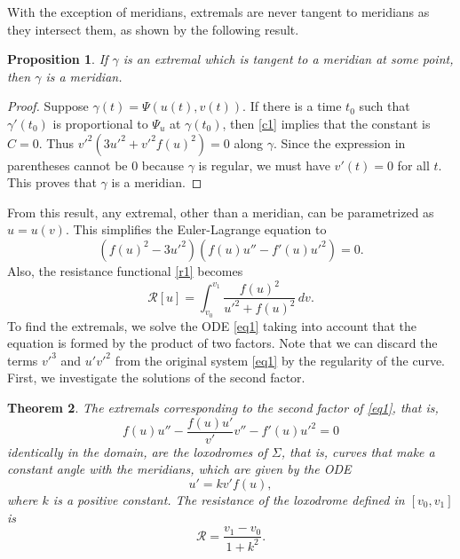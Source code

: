 \documentclass[a4paper,12pt]{amsart}
\newtheorem{theorem}{Theorem}[section]
\newtheorem{proposition}[theorem]{Proposition}
\theoremstyle{definition}
\def\R{\mathcal{ R}}
\begin{document}
With the exception of meridians, extremals are never tangent to meridians as they intersect them, as shown by the following result. 

\begin{proposition} If $\gamma$ is an extremal which is tangent to a meridian at some point, then $\gamma$ is a meridian.
\end{proposition}

\begin{proof} 
Suppose $\gamma(t)=\Psi(u(t),v(t))$. If there is a time $t_0$ such that $\gamma'(t_0)$ is proportional to $\Psi_u$ at $\gamma(t_0)$, then \eqref{c1} implies that the constant is $C=0$. Thus $v'^2(3u'^2+v'^2f(u)^2)=0$ along $\gamma$. Since the expression in parentheses cannot be $0$ because $\gamma$ is regular, we must have $v'(t)=0$ for all $t$. This proves that $\gamma$ is a meridian.
\end{proof}

From this result, any extremal, other than a meridian, can be parametrized as $u=u(v)$. This simplifies the Euler-Lagrange equation to
\begin{equation}\label{EL}
 \left( f(u)^2 - 3u'^2 \right) \left( f(u)u'' - f'(u)u'^2 \right)= 0.
\end{equation}
Also, the resistance functional \eqref{r1} becomes 
\begin{equation}\label{r11}
\R[u]=\int_{v_0}^{v_1}\frac{f(u)^2}{u'^2+f(u)^2}\, dv.
\end{equation}
To find the extremals, we solve the ODE \eqref{eq1} taking into account that the equation is formed by the product of two factors. 
Note that we can discard the terms $v'^3$ and $u'v'^2$ from the original system \eqref{eq1}  by the regularity of the curve. First, we investigate the solutions of the second factor. 

\begin{theorem} \label{t1}
  The extremals corresponding to the second factor of \eqref{eq1}, that is, 
\begin{equation}\label{f2}
 f(u) u'' - \frac{f(u) u'}{v'} v'' - f'(u) u'^2 =0
 \end{equation}
identically in the domain, are the loxodromes of $\Sigma$, that is, curves that make a constant angle with the meridians, which are given by the ODE
 \begin{equation}\label{lo1}
 u'=kv'f(u),
 \end{equation}
 where $k$ is a positive constant. The resistance of the loxodrome defined in $[v_0,v_1]$ is 
\begin{equation}\label{r5}
\mathcal{R}=\frac{v_1-v_0}{1+k^2}.
\end{equation}
\end{theorem}
 
\end{document}
